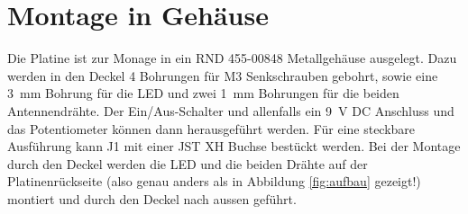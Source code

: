 \documentclass[a4paper,11pt,halfparskip,smallheadings,DIV=10]{scrartcl}
\begin{document}
\section{Montage in Gehäuse}
Die Platine ist zur Monage in ein RND 455-00848 Metallgehäuse ausgelegt. Dazu
werden in den Deckel 4 Bohrungen für M3 Senkschrauben gebohrt, sowie eine 3~mm
Bohrung für die LED und zwei 1~mm Bohrungen für die beiden Antennendrähte. Der
Ein/Aus-Schalter und allenfalls ein 9~V DC Anschluss und das Potentiometer
können dann herausgeführt werden. Für eine steckbare Ausführung kann J1
mit einer JST XH Buchse bestückt werden. Bei der Montage durch den Deckel
werden die LED und die beiden Drähte auf der Platinenrückseite (also genau
anders als in Abbildung \ref{fig:aufbau} gezeigt!) montiert und durch den
Deckel nach aussen geführt.
\end{document}
